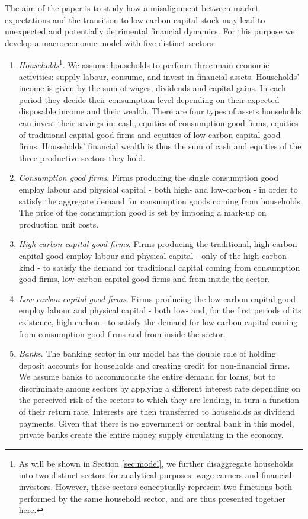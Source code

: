 \documentclass[authoryear]{article}
\begin{document}
The aim of the paper is to study how a misalignment between market expectations and the transition to low-carbon capital stock may lead to unexpected and potentially detrimental financial dynamics. For this purpose we develop a macroeconomic model with five distinct sectors:
\begin{enumerate}[noitemsep,nolistsep,leftmargin=*]
\item \emph{Households}\footnote{As will be shown in Section \ref{sec:model}, we further disaggregate households into two distinct sectors for analytical purposes: wage-earners and financial investors. However, these sectors conceptually represent two functions both performed by the same household sector, and are thus presented together here.}.
We assume households to perform three main economic activities: supply labour, consume, and invest in financial assets. Households' income is given by the sum of wages, dividends and capital gains. In each period they decide their consumption level depending on their expected disposable income and their wealth. There are four types of assets households can invest their savings in: cash, equities of consumption good firms, equities of traditional capital good firms and equities of low-carbon capital good firms. Households' financial wealth is thus the sum of cash and equities of the three productive sectors they hold. 
\item \emph{Consumption good firms}. Firms producing the single consumption good employ labour and physical capital - both high- and low-carbon - in order to satisfy the aggregate demand for consumption goods coming from households. The price of the consumption good is set by imposing a mark-up on production unit costs.
\item \emph{High-carbon capital good firms}. Firms producing the traditional, high-carbon capital good employ labour and physical capital - only of the high-carbon kind - to satisfy the demand for traditional capital coming from consumption good firms, low-carbon capital good firms and from inside the sector. 
\item \emph{Low-carbon capital good firms}. Firms producing the low-carbon capital good employ labour and physical capital - both low- and, for the first periods of its existence, high-carbon - to satisfy the demand for low-carbon capital coming from consumption good firms and from inside the sector. 
\item \emph{Banks}. The banking sector in our model has the double role of holding deposit accounts for households and creating credit for non-financial firms. We assume banks to accommodate the entire demand for loans, but to discriminate among sectors by applying a different interest rate depending on the perceived risk of the sectors to which they are lending, in turn a function of their return rate. Interests are then transferred to households as dividend payments. Given that there is no government or central bank in this model, private banks create the entire money supply circulating in the economy. \\
\end{enumerate}
\end{document}
